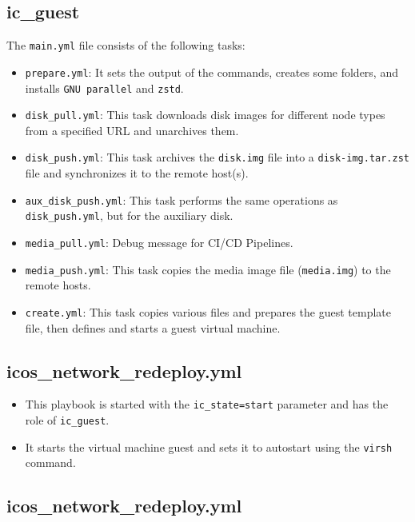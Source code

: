 \subsection{ic\_guest}

The \texttt{main.yml} file consists of the following tasks:

\begin{itemize}
    \item \texttt{prepare.yml}: It sets the output of the commands, creates some folders, and installs \texttt{GNU parallel} and 
    \texttt{zstd}.
    \item \texttt{disk\_pull.yml}: This task downloads disk images for different node types from a specified URL and unarchives 
    them.
    \item \texttt{disk\_push.yml}: This task archives the \texttt{disk.img} file into a \texttt{disk-img.tar.zst} file and 
    synchronizes it to the remote host(s).
    \item \texttt{aux\_disk\_push.yml}: This task performs the same operations as \texttt{disk\_push.yml}, but for the auxiliary 
    disk.
    \item \texttt{media\_pull.yml}: Debug message for CI/CD Pipelines.
    \item \texttt{media\_push.yml}: This task copies the media image file (\texttt{media.img}) to the remote hosts.
    \item \texttt{create.yml}: This task copies various files and prepares the guest template file, then defines and starts a guest virtual machine.
\end{itemize}

\subsection{icos\_network\_redeploy.yml}

\begin{itemize}
    \item This playbook is started with the \texttt{ic\_state=start} parameter and has the role of \texttt{ic\_guest}.
    \item It starts the virtual machine guest and sets it to autostart using the \texttt{virsh} command.
\end{itemize}

\subsection{icos\_network\_redeploy.yml}

